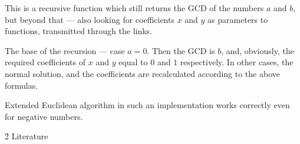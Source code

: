 This is a recursive function which still returns the GCD of the numbers $a$ and $b$, but beyond that --- also looking for coefficients $x$ and $y$ as parameters to functions, transmitted through the links.

The base of the recursion --- case $a = 0$. Then the GCD is $b$, and, obviously, the required coefficients of $x$ and $y$ equal to $0$ and $1$ respectively. In other cases, the normal solution, and the coefficients are recalculated according to the above formulas.

Extended Euclidean algorithm in such an implementation works correctly even for negative numbers.


\h2{ Literature }

\ul{
\li {}
}